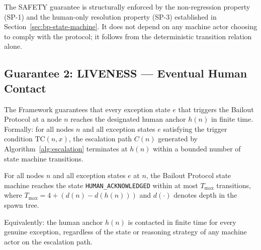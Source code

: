 The SAFETY guarantee is structurally enforced by the non-regression property
(SP-1) and the human-only resolution property (SP-3) established in
Section~\ref{sec:bp-state-machine}.  It does not depend on any machine actor
choosing to comply with the protocol; it follows from the deterministic
transition relation alone.

\subsection{Guarantee 2: LIVENESS --- Eventual Human Contact}
\label{sec:liveness}

\begin{definition}
\label{def:liveness}
The \bxthree{} Framework guarantees that every exception state $e$ that
triggers the Bailout Protocol at a node $n$ reaches the designated human
anchor $h(n)$ in finite time.  Formally: for all nodes $n$ and all exception
states $e$ satisfying the trigger condition $\text{TC}(n, x)$, the escalation
path $C(n)$ generated by Algorithm~\ref{alg:escalation} terminates at $h(n)$
within a bounded number of state machine transitions.
\end{definition}

\begin{maintheorem}[LIVENESS]
\label{th:liveness}
For all nodes $n$ and all exception states $e$ at $n$, the Bailout Protocol
state machine reaches the state \texttt{HUMAN\_ACKNOWLEDGED} within at most
$T_{\max}$ transitions, where $T_{\max} = 4 + (d(n) - d(h(n)))$ and
$d(\cdot)$ denotes depth in the spawn tree.

\medskip
\noindent Equivalently: the human anchor $h(n)$ is contacted in finite time for
every genuine exception, regardless of the state or reasoning strategy of any
machine actor on the escalation path.
\end{maintheorem}

